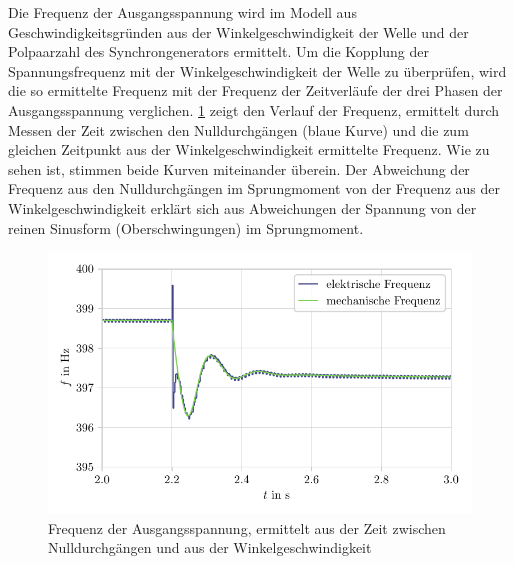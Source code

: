 Die Frequenz der Ausgangsspannung wird im Modell aus Geschwindigkeitsgründen aus der Winkelgeschwindigkeit der Welle und der Polpaarzahl des Synchrongenerators ermittelt. Um die Kopplung der Spannungsfrequenz mit der Winkelgeschwindigkeit der Welle zu überprüfen, wird die so ermittelte Frequenz mit der Frequenz der Zeitverläufe der drei Phasen der Ausgangsspannung verglichen. \cref{fig:Verifikation_Frequenz} zeigt den Verlauf der Frequenz, ermittelt durch Messen der Zeit zwischen den Nulldurchgängen (blaue Kurve) und die zum gleichen Zeitpunkt aus der Winkelgeschwindigkeit ermittelte Frequenz. Wie zu sehen ist, stimmen beide Kurven miteinander überein. Der Abweichung der Frequenz aus den Nulldurchgängen im Sprungmoment von der Frequenz aus der Winkelgeschwindigkeit erklärt sich aus Abweichungen der Spannung von der reinen Sinusform (Oberschwingungen) im Sprungmoment.
\begin{figure}
    \centering
    \includegraphics{Bilder/Verifikation_Frequenz.pdf}
    \caption{Frequenz der Ausgangsspannung, ermittelt aus der Zeit zwischen Nulldurchgängen und aus der Winkelgeschwindigkeit}
    \label{fig:Verifikation_Frequenz}
\end{figure}

